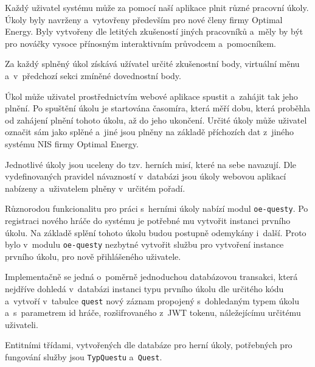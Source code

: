 \documentclass[twoside, 12pt]{article}
\begin{document}
{\begin{lstlisting}
\end{lstlisting}

\clearpage


Každý uživatel systému může za pomocí naší aplikace plnit různé pracovní úkoly.
Úkoly byly navrženy a~vytovřeny především pro nové členy firmy Optimal Energy.
Byly vytvořeny dle letitých zkušeností jiných pracovníků
a~měly by být pro nováčky vysoce přínosným interaktivním průvodcem a~pomocníkem.

Za každý splněný úkol získává užívatel určité zkušenostní body,
virtuální měnu a~v~předchozí sekci zmíněné dovednostní body.

Úkol může uživatel prostřednictvím webové aplikace spustit a~zahájit tak jeho plnění.
Po spuštění úkolu je startována časomíra, která měří dobu,
která proběhla od zahájení plnění tohoto úkolu, až do jeho ukončení.
Určité úkoly může uživatel označit sám jako splěné
a~jiné jsou plněny na základě příchozích dat z~jiného systému NIS firmy Optimal Energy.

Jednotlivé úkoly jsou uceleny do tzv. herních misí, které na sebe navazují.
Dle vydefinovaných pravidel návazností v~databázi jsou úkoly webovou aplikací nabízeny
a~uživatelem plněny v~určitém pořadí.

Různorodou funkcionalitu pro práci s~herními úkoly nabízí modul \texttt{oe-questy}.
Po registraci nového hráče do systému je potřebné mu vytvořit instanci prvního úkolu.
Na základě splění tohoto úkolu budou postupně odemykány i~další.
Proto bylo v~modulu \texttt{oe-questy} nezbytné vytvořit službu pro vytvoření instance prvního úkolu,
pro nově přihlášeného uživatele.

Implementačně se jedná o~poměrně jednoduchou databázovou transakci,
která nejdříve dohledá v~databázi instanci typu prvního úkolu dle určitého kódu a~vytvoří v~tabulce \texttt{quest}
nový záznam propojený s~dohledaným typem úkolu a~s~parametrem id hráče,
rozšifrovaného z~JWT tokenu, náležejícímu určitému uživateli.


Entitními třídami, vytvořených dle databáze pro herní úkoly,
potřebných pro fungování služby jsou \texttt{TypQuestu} a~\texttt{Quest}.


\obrazek
{}


}
\end{document}

